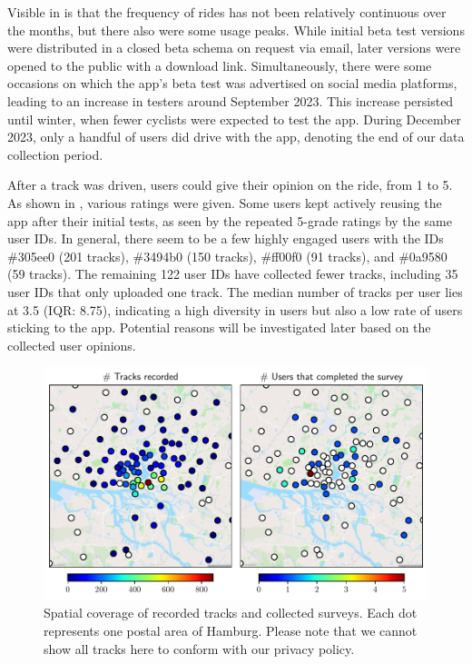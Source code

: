 Visible in  is that the frequency of rides has not been relatively continuous over the months, but there also were some usage peaks. While initial beta test versions were distributed in a closed beta schema on request via email, later versions were opened to the public with a download link. Simultaneously, there were some occasions on which the app's beta test was advertised on social media platforms, leading to an increase in testers around September 2023. This increase persisted until winter, when fewer cyclists were expected to test the app. During December 2023, only a handful of users did drive with the app, denoting the end of our data collection period. 

After a track was driven, users could give their opinion on the ride, from 1 to 5. As shown in , various ratings were given. Some users kept actively reusing the app after their initial tests, as seen by the repeated 5-grade ratings by the same user IDs. In general, there seem to be a few highly engaged users with the IDs \#305ee0 (201 tracks), \#3494b0 (150 tracks), \#ff00f0 (91 tracks), and \#0a9580 (59 tracks). The remaining 122 user IDs have collected fewer tracks, including 35 user IDs that only uploaded one track. The median number of tracks per user lies at 3.5 (IQR: 8.75), indicating a high diversity in users but also a low rate of users sticking to the app. Potential reasons will be investigated later based on the collected user opinions.

\begin{figure}[t]
\caption{Spatial coverage of recorded tracks and collected surveys. Each dot represents one postal area of Hamburg. Please note that we cannot show all tracks here to conform with our privacy policy.}\label{fig:app-spatial-distribution}
\includegraphics[width=\linewidth]{images/app-spatial-distribution.pdf}
\end{figure}

